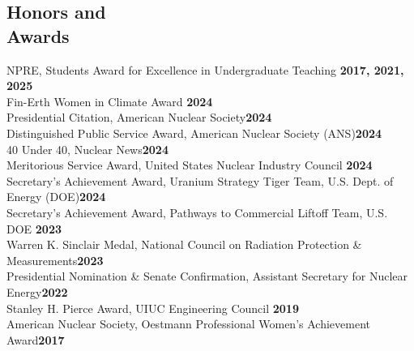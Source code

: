 \documentclass[margin,line]{resume}
\begin{document}
\begin{resume}
    \section{\mysidestyle Honors and\\Awards}
                NPRE, Students Award for Excellence in Undergraduate Teaching \hfill \textbf{2017, 2021, 2025}\vspace{.5mm}\\%
                Fin-Erth Women in Climate Award \hfill \textbf{2024}\vspace{.5mm}\\%
                Presidential Citation, American Nuclear Society\hfill \textbf{2024}\vspace{.5mm}\\%
                Distinguished Public Service Award, American Nuclear Society (ANS)\hfill \textbf{2024}\vspace{.5mm}\\%
                40 Under 40, Nuclear News\hfill \textbf{2024}\vspace{.5mm}\\%
                Meritorious Service Award, United States Nuclear Industry Council \hfill \textbf{2024}\vspace{.5mm}\\%
                Secretary's Achievement Award, Uranium Strategy Tiger Team, U.S. Dept. of Energy (DOE)\hfill \textbf{2024}\vspace{0.5mm}\\%
                Secretary's Achievement Award, Pathways to Commercial Liftoff Team, U.S. DOE \hfill \textbf{2023}\vspace{0.5mm}\\%
                Warren K. Sinclair Medal, National Council on Radiation Protection \& Measurements\hfill \textbf{2023}\vspace{.5mm}\\%
                Presidential Nomination \& Senate Confirmation, Assistant Secretary for Nuclear Energy\hfill \textbf{2022}\vspace{.5mm}\\%
                Stanley H. Pierce Award, UIUC Engineering Council \hfill \textbf{2019}\vspace{.5mm}\\%
                American Nuclear Society, Oestmann Professional Women's Achievement Award\hfill \textbf{2017}\vspace{.5mm}\\%

\end{resume}
\end{document}
